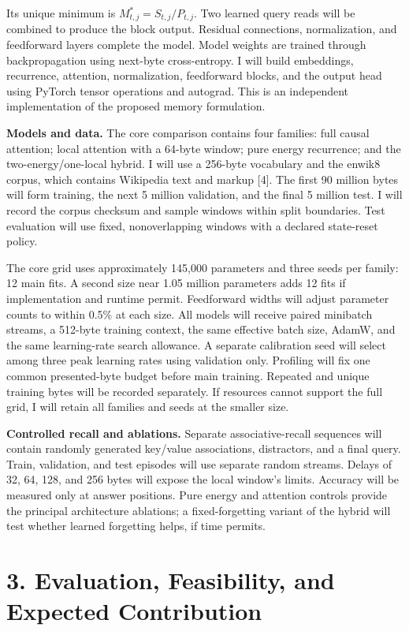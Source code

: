 \documentclass[11pt,letterpaper]{article}
\begin{document}
Its unique minimum is \(M_{t,j}^{*}=S_{t,j}/P_{t,j}\). Two learned query reads will be combined to produce the block output. Residual connections, normalization, and feedforward layers complete the model. Model weights are trained through backpropagation using next-byte cross-entropy. I will build embeddings, recurrence, attention, normalization, feedforward blocks, and the output head using PyTorch tensor operations and autograd. This is an independent implementation of the proposed memory formulation.

\textbf{Models and data.} The core comparison contains four families: full causal attention; local attention with a 64-byte window; pure energy recurrence; and the two-energy/one-local hybrid. I will use a 256-byte vocabulary and the enwik8 corpus, which contains Wikipedia text and markup [4]. The first 90 million bytes will form training, the next 5 million validation, and the final 5 million test. I will record the corpus checksum and sample windows within split boundaries. Test evaluation will use fixed, nonoverlapping windows with a declared state-reset policy.

The core grid uses approximately 145,000 parameters and three seeds per family: 12 main fits. A second size near 1.05 million parameters adds 12 fits if implementation and runtime permit. Feedforward widths will adjust parameter counts to within 0.5\% at each size. All models will receive paired minibatch streams, a 512-byte training context, the same effective batch size, AdamW, and the same learning-rate search allowance. A separate calibration seed will select among three peak learning rates using validation only. Profiling will fix one common presented-byte budget before main training. Repeated and unique training bytes will be recorded separately. If resources cannot support the full grid, I will retain all families and seeds at the smaller size.

\textbf{Controlled recall and ablations.} Separate associative-recall sequences will contain randomly generated key/value associations, distractors, and a final query. Train, validation, and test episodes will use separate random streams. Delays of 32, 64, 128, and 256 bytes will expose the local window's limits. Accuracy will be measured only at answer positions. Pure energy and attention controls provide the principal architecture ablations; a fixed-forgetting variant of the hybrid will test whether learned forgetting helps, if time permits.

\newpage
\section*{3. Evaluation, Feasibility, and Expected Contribution}
\end{document}
